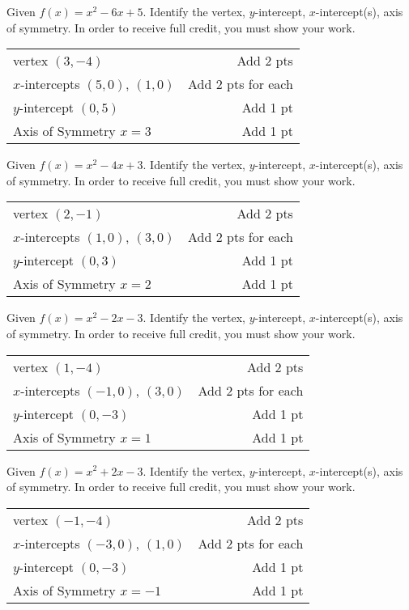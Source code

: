 {
	Given $f(x)=x^2-6x+5$. Identify the vertex, $y$-intercept, $x$-intercept(s), axis of symmetry. In order to receive full credit, you must show your work.}
{
	\begin{tabular}{l r}
	vertex $(3, -4)$ & Add 2 pts\\
	$x$-intercepts $(5,0)$, $(1, 0)$ & Add 2 pts for each\\
	$y$-intercept $(0,5)$ & Add 1 pt\\
	Axis of Symmetry  $x=3$ & Add 1 pt\\
	\end{tabular}
}

{
	Given $f(x)=x^2-4x+3$. Identify the vertex,  $y$-intercept, $x$-intercept(s), axis of symmetry. In order to receive full credit, you must show your work.}
{
	\begin{tabular}{l r}
	vertex $(2, -1)$ & Add 2 pts\\
	$x$-intercepts $(1,0)$, $(3, 0)$ & Add 2 pts for each\\
	$y$-intercept $(0,3)$ & Add 1 pt\\
	Axis of Symmetry  $x=2$ & Add 1 pt\\
	\end{tabular}
}

{
	Given $f(x)=x^2-2x-3$. Identify the vertex,  $y$-intercept, $x$-intercept(s), axis of symmetry. In order to receive full credit, you must show your work.
}
{
	\begin{tabular}{l r}
	vertex $(1, -4)$ & Add 2 pts\\
	$x$-intercepts $(-1,0)$, $(3, 0)$ & Add 2 pts for each\\
	$y$-intercept $(0,-3)$ & Add 1 pt\\
	Axis of Symmetry  $x=1$ & Add 1 pt\\
	\end{tabular}
}

{
	Given $f(x)=x^2+2x-3$. Identify the vertex,  $y$-intercept, $x$-intercept(s), axis of symmetry. In order to receive full credit, you must show your work.
}
{
	\begin{tabular}{l r}
	vertex $(-1, -4)$ & Add 2 pts\\
	$x$-intercepts $(-3,0)$, $(1, 0)$ & Add 2 pts for each\\
	$y$-intercept $(0,-3)$ & Add 1 pt\\
	Axis of Symmetry  $x=-1$ & Add 1 pt\\
	\end{tabular}
}
